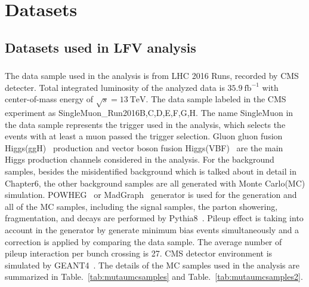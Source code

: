 
\chapter{Datasets}
\section{Datasets used in LFV analysis}
\subsection{\Hmuhad}
The data sample used in the analysis is from LHC 2016 Runs, recorded by CMS detecter. Total integrated luminosity of the analyzed data is $35.9 ~\textrm{fb}^{-1} $ with center-of-mass energy of $ \sqrt{s}=13 ~\textrm{TeV} $. The data sample labeled in the CMS experiment as SingleMuon\_Run2016B,C,D,E,F,G,H. The name SingleMuon in the data sample represents the trigger used in the analysis, which selects the events with at least a muon passed the trigger selection. Gluon gluon fusion Higgs(ggH)~\cite{Georgi:1977gs} production and vector boson fusion Higgs(VBF)~\cite{Cahn:1986zv} are the main Higgs production channels considered in the analysis. For the background samples, besides the misidentified background which is talked about in detail in Chapter6, the other background samples are all generated with Monte Carlo(MC) simulation.  POWHEG~\cite{POWHEG-BOX} or MadGraph~\cite{Alwall:2014} generator is used for the generation and all of the MC samples, including the signal samples, the parton showering, fragmentation, and decays are performed by Pythia8~\cite{Sjostrand:2014zea}.  Pileup effect is taking into account in the generator by generate minimum bias events simultaneously and a correction is applied by comparing the data sample. The average number of pileup interaction per bunch crossing is 27. CMS detector environment is simulated by GEANT4~\cite{GEANT4}. The details of the MC samples used in the analysis are summarized in Table.~\ref{tab:mutaumcsamples} and Table.~\ref{tab:mutaumcsamples2}.

